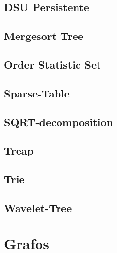 \documentclass[12pt, a4paper, twoside]{article}
\begin{document}
\subsection{DSU Persistente}


\subsection{Mergesort Tree}


\subsection{Order Statistic Set}


\subsection{Sparse-Table}


\subsection{SQRT-decomposition}


\subsection{Treap}


\subsection{Trie}


\subsection{Wavelet-Tree}



%
%

\section{Grafos}
\end{document}
